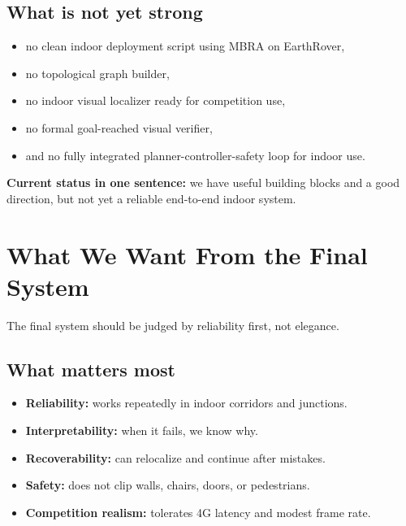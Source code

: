 \documentclass[11pt,a4paper]{article}
\begin{document}
\subsection{What is not yet strong}

\begin{itemize}[nosep]
  \item no clean indoor deployment script using MBRA on EarthRover,
  \item no topological graph builder,
  \item no indoor visual localizer ready for competition use,
  \item no formal goal-reached visual verifier,
  \item and no fully integrated planner-controller-safety loop for indoor use.
\end{itemize}

\begin{mdframed}
\textbf{Current status in one sentence:} we have useful building blocks and a
good direction, but not yet a reliable end-to-end indoor system.
\end{mdframed}


\section{What We Want From the Final System}

The final system should be judged by reliability first, not elegance.

\subsection{What matters most}

\begin{itemize}[nosep]
  \item \textbf{Reliability:} works repeatedly in indoor corridors and junctions.
  \item \textbf{Interpretability:} when it fails, we know why.
  \item \textbf{Recoverability:} can relocalize and continue after mistakes.
  \item \textbf{Safety:} does not clip walls, chairs, doors, or pedestrians.
  \item \textbf{Competition realism:} tolerates 4G latency and modest frame rate.
\end{itemize}
\end{document}
